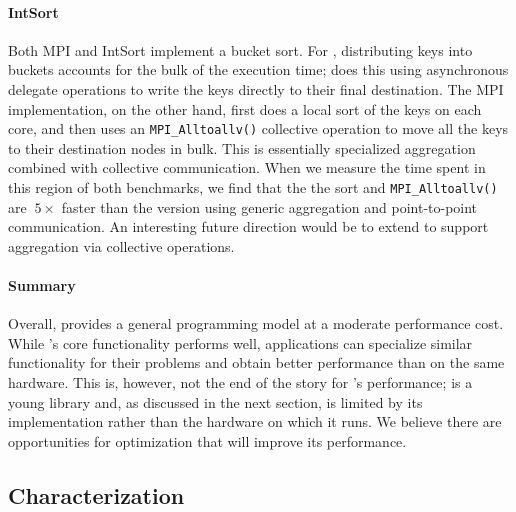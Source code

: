 \paragraph{IntSort}
Both MPI and \Grappa IntSort implement a bucket sort. For \Grappa,
distributing keys into buckets accounts for the bulk of the execution
time; \Grappa does this using asynchronous delegate operations to
write the keys directly to their final destination. The MPI
implementation, on the other hand, first does a local sort of the keys
on each core, and then uses an \texttt{MPI\_Alltoallv()} collective
operation to move all the keys to their destination nodes in
bulk. This is essentially specialized aggregation combined with
collective communication. When we measure the time spent in this
region of both benchmarks, we find that the the sort and
\texttt{MPI\_Alltoallv()} are $~5\times$ faster than the \Grappa
version using generic aggregation and point-to-point communication. An
interesting future direction would be to extend \Grappa to support
aggregation via collective operations.


\paragraph{Summary}

Overall, \Grappa provides a general programming model at a moderate
performance cost. While \Grappa's core functionality performs well,
applications can specialize similar functionality for their problems
and obtain better performance than \Grappa on the same hardware. This
is, however, not the end of the story for \Grappa's performance;
\Grappa is a young library and, as discussed in the next section, is
limited by its implementation rather than the hardware on which it
runs. We believe there are opportunities for optimization that will
improve its performance.

\subsection{Characterization}


